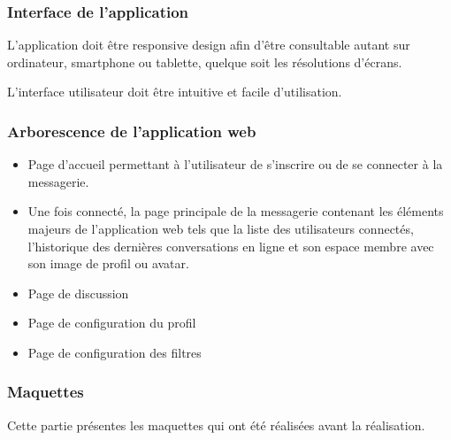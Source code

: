 \subsubsection{Interface de l’application}

\par L’application doit être responsive design afin d’être consultable autant sur ordinateur, smartphone ou tablette, quelque soit les résolutions d’écrans.

\par L’interface utilisateur doit être intuitive et facile d’utilisation.

\subsubsection{Arborescence de l’application web}

\begin{itemize}
	\item Page d'accueil permettant à l’utilisateur de s'inscrire ou de se connecter à la messagerie.
	\item Une fois connecté, la page principale de la messagerie contenant les éléments majeurs de l'application web tels que la liste des utilisateurs connectés, l’historique des dernières conversations en ligne et son espace membre avec son image de profil ou avatar.
	\item Page de discussion
	\item Page de configuration du profil
	\item Page de configuration des filtres
\end{itemize}

\subsubsection{Maquettes}

Cette partie présentes les maquettes qui ont été réalisées avant la réalisation. 

